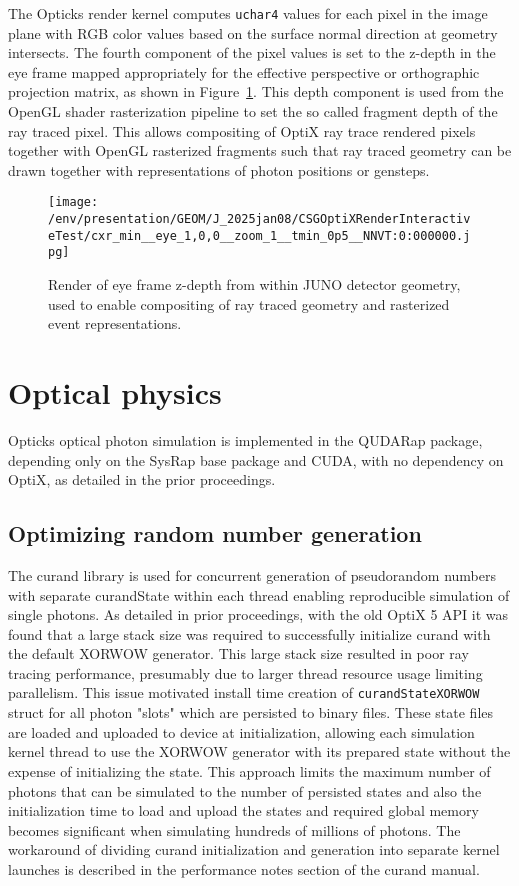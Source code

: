 \documentclass{webofc}
\begin{document}
The Opticks render kernel computes {\tt uchar4} values for each pixel in the image 
plane with RGB color values based on the surface normal direction at geometry intersects. 
The fourth component of the pixel values is set to the z-depth in the eye frame 
mapped appropriately for the effective perspective or orthographic projection matrix, 
as shown in Figure~\ref{depth}.  
This depth component is used from the OpenGL shader rasterization pipeline to set the 
so called fragment depth of the ray traced pixel. This allows compositing of OptiX ray 
trace rendered pixels together with OpenGL rasterized fragments such that 
ray traced geometry can be drawn together with representations of photon positions or gensteps.
%
%
\begin{figure}
\centering
\texttt{[image: /env/presentation/GEOM/J\_2025jan08/CSGOptiXRenderInteractiveTest/cxr\_min\_\_eye\_1,0,0\_\_zoom\_1\_\_tmin\_0p5\_\_NNVT:0:000000.jpg]}
\caption{Render of eye frame z-depth from within JUNO detector geometry, used to enable compositing of ray traced geometry and rasterized event representations.}  
\label{depth}
\vspace{-5mm}
\end{figure}%
%
% 
\section{Optical physics}%
%
Opticks optical photon simulation is implemented in the QUDARap package, 
depending only on the SysRap base package and CUDA, with no dependency on OptiX,
as detailed in the prior proceedings\cite{chep2023}.
%
\subsection{Optimizing random number generation}
%
The curand library\cite{curand} is used for concurrent generation 
of pseudorandom numbers with separate curandState within each thread
enabling reproducible simulation of single photons.
As detailed in prior proceedings\cite{chep2016}, with the old OptiX 5 API
it was found that a large stack size was required to successfully initialize curand
with the default XORWOW generator. This large stack size resulted in poor ray tracing 
performance, presumably due to larger thread resource usage limiting parallelism.  
This issue motivated install time creation of {\tt curandStateXORWOW} struct 
for all photon "slots" which are persisted to binary files.  
These state files are loaded and uploaded to device at initialization,  
allowing each simulation kernel thread to use the XORWOW generator with its 
prepared state without the expense of initializing the state. 
This approach limits the maximum number of photons 
that can be simulated to the number of persisted states and also the initialization time 
to load and upload the states and required global memory becomes significant when simulating 
hundreds of millions of photons. 
The workaround of dividing curand initialization and generation into 
separate kernel launches is described in the performance notes 
section of the curand manual\cite{curand}. 
\end{document}

